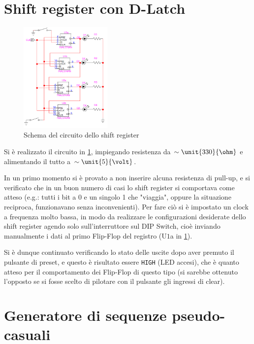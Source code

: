 \documentclass[a4paper,10pt]{article}
\def\code#1{\texttt{#1}}
\begin{document}
\pagebreak

\section{Shift register con D-Latch}

\begin{figure}
	\vspace{-20pt}
	\centering
	\includegraphics[width=0.4\textwidth]{../grafici/shiftreg.png}
	\vspace{-10pt}
	\caption{Schema del circuito dello shift register}
	\label{fig:shift}
	\vspace{-40pt}
\end{figure}

Si è realizzato il circuito in \cref{fig:shift}, impiegando resistenza da $\sim \unit{330}{\ohm}$ e alimentando il tutto a $\sim \unit{5}{\volt}$.

In un primo momento si è provato a non inserire alcuna resistenza di pull-up, e si verificato che in un buon numero di casi lo shift register si comportava come atteso (e.g.: tutti i bit a 0 e un singolo 1 che "viaggia", oppure la situazione reciproca, funzionavano senza inconvenienti). 
Per fare ciò si è impostato un clock a frequenza molto bassa, in modo da realizzare le configurazioni desiderate dello shift register agendo solo sull'interruttore sul DIP Switch, cioè inviando manualmente i dati al primo Flip-Flop del registro (U$1$a in \cref{fig:shift}).

Si è dunque continuato verificando lo stato delle uscite dopo aver premuto il pulsante di preset, e questo è risultato essere \code{HIGH} (LED accesi), che è quanto atteso per il comportamento dei Flip-Flop di questo tipo (si sarebbe ottenuto l'opposto se si fosse scelto di pilotare con il pulsante gli ingressi di clear).

\section{Generatore di sequenze pseudo-casuali}
\end{document}
